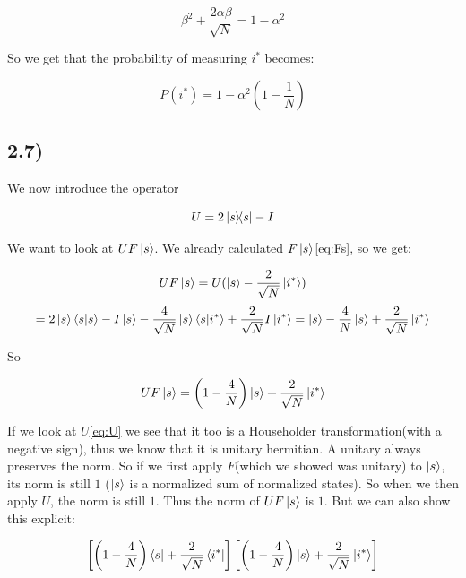 \documentclass[a4paper,norsk, 10pt]{article}
\begin{document}
\begin{equation}
\beta^2 + \frac{2\alpha \beta}{\sqrt{N}}  = 1 - \alpha^2
\end{equation}

So we get that the probability of measuring $i^*$ becomes:

\begin{equation}
P(i^*) = 1 - \alpha^2\left(1 - \frac{1}{N}\right)
\end{equation}\label{eq:prob}

\subsection{2.7)}

We now introduce the operator

\begin{equation}
U = 2\ketbra{s}{s} - I
\end{equation}\label{eq:U}

We want to look at $UF\ket{s}$. We already calculated $F\ket{s}$\eqref{eq:Fs}, so we get: 

\begin{equation}
UF\ket{s} = U(\ket{s} - \frac{2}{\sqrt{N}}\ket{i^*})
\end{equation}
\begin{equation}
= 2\ket{s}\braket{s}{s} - I\ket{s} - \frac{4}{\sqrt{N}}\ket{s}\braket{s}{i^*} + \frac{2}{\sqrt{N}}I\ket{i^*} = \ket{s} - \frac{4}{N}\ket{s} + \frac{2}{\sqrt{N}}\ket{i^*} 
\end{equation}

So

\begin{equation}
UF\ket{s} =  \left(1 - \frac{4}{N}\right)\ket{s} + \frac{2}{\sqrt{N}}\ket{i^*} 
\end{equation}\label{eq:UFs}


If we look at $U$\eqref{eq:U} we see that it too is a Householder transformation(with a negative sign), thus we know that it is unitary hermitian. A unitary always preserves the norm. So if we first apply $F$(which we showed was unitary) to $\ket{s}$, its norm is still $1$ ($\ket{s}$ is a normalized sum of normalized states). So when we then apply $U$, the norm is still $1$. Thus the norm of $UF\ket{s}$ is $1$. But we can also show this explicit:

\begin{equation}
\left[\left(1 - \frac{4}{N}\right)\bra{s} + \frac{2}{\sqrt{N}}\bra{i^*}\right]\left[\left(1 - \frac{4}{N}\right)\ket{s} + \frac{2}{\sqrt{N}}\ket{i^*}\right]
\end{equation}
\end{document}
